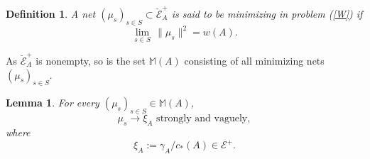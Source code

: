 \documentclass[12pt,a4paper,reqno]{amsart} %
\theoremstyle{lause}
\theoremstyle{maaritelma}
\theoremstyle{lause}
\newtheorem{lemma}[theorem]{Lemma}
\theoremstyle{maaritelma}
\newtheorem{definition}[theorem]{Definition}
\numberwithin{equation}{section}
\begin{document}
\begin{definition}\label{def-min}
  A net $(\mu_s)_{s\in S}\subset\breve{\mathcal E}^+_A$ is said to be {\it minimizing\/} in problem (\ref{W}) if
\begin{equation}\label{8}\lim_{s\in S}\,\|\mu_s\|^2=w(A).\end{equation}
\end{definition}

As $\breve{\mathcal E}^+_A$ is nonempty, so is the set $\mathbb M(A)$ consisting of all minimizing nets $(\mu_s)_{s\in S}$.

\begin{lemma}\label{l-extr}For every\/ $(\mu_s)_{s\in S}\in\mathbb M(A)$,
\begin{equation}\label{limm'}\mu_s\to\xi_A\text{ \ strongly and vaguely},\end{equation}
where
\begin{equation}\label{extrcap}\xi_A:=\gamma_A/c_*(A)\in\mathcal E^+.
\end{equation}
\end{lemma}
\end{document}
